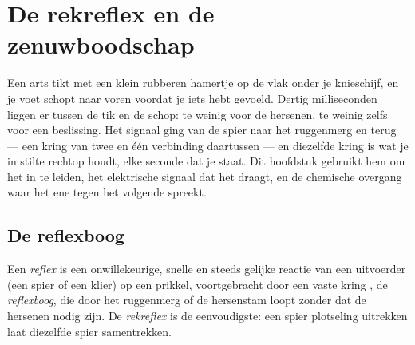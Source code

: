 \chapter{De rekreflex en de zenuwboodschap}\label{ch:g12:stretch-reflex}

Een arts tikt met een klein rubberen hamertje op de  vlak onder je
knieschijf, en je voet schopt naar voren voordat je iets hebt gevoeld.
Dertig milliseconden liggen er tussen de tik en de schop: te weinig voor
de hersenen, te weinig zelfs voor een beslissing. Het signaal ging van de
spier naar het ruggenmerg en terug --- een kring van twee  en één
verbinding daartussen --- en diezelfde kring is wat je in stilte
rechtop houdt, elke seconde dat je staat. Dit hoofdstuk gebruikt hem om
het  in te leiden, het elektrische signaal dat het draagt, en de
chemische overgang waar het ene  tegen het volgende spreekt.

\section{De reflexboog}

\begin{definition}[Reflex]\label{def:g12:stretch-reflex:reflex}
Een \emph{reflex} is een onwillekeurige, snelle en steeds
gelijke reactie van een uitvoerder (een spier of een klier) op een
prikkel, voortgebracht door een vaste kring , de
\emph{reflexboog}, die door het ruggenmerg of de
hersenstam loopt zonder dat de hersenen nodig zijn. De
\emph{rekreflex} is de eenvoudigste: een spier plotseling
uitrekken laat diezelfde spier samentrekken.
\end{definition}

